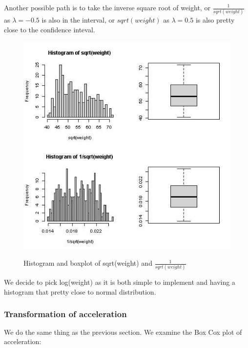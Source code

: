 Another possible path is to take the inverse square root of weight, or $\frac{1}{sqrt(weight)}$ as $\lambda = -0.5$ is also in the interval, or $sqrt(weight)$ as $\lambda = 0.5$ is also pretty close to the confidence inteval.

\begin{figure}[H]
\centering
\includegraphics[scale=0.7]{img/weighttrans2.jpeg}
\label{fig:my_label_with_H}
\caption{Histogram and boxplot of sqrt(weight) and $\frac{1}{sqrt(weight)}$}
\end{figure}

We decide to pick log(weight) as it is both simple to implement and having a histogram that pretty close to normal distribution.

\subsubsection{Transformation of acceleration}

We do the same thing as the previous section. We examine the Box Cox plot of acceleration:

